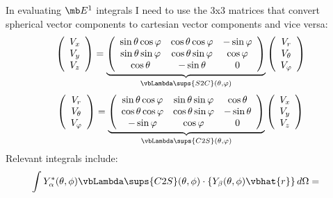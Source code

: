 \documentclass[letterpaper]{article}
\begin{document}
In evaluating $\mb E^1$ integrals I need to use the 3x3 matrices
that convert spherical vector components to cartesian vector components
and vice versa:
$$ \left(\begin{array}{c}V_x \\ V_y \\ V_z\end{array}\right)
  =
   \underbrace{
   \left(\begin{array}{ccc}
   \sin\theta\cos\varphi & \cos\theta \cos \varphi & -\sin\varphi \\
   \sin\theta\sin\varphi & \cos\theta \sin \varphi & \cos\varphi \\
   \cos\theta & -\sin\theta & 0
   \end{array}\right)
              }_{\vbLambda\sups{S2C}(\theta,\varphi)}
   \left(\begin{array}{c}V_r \\ V_\theta \\ V_\varphi\end{array}\right)
$$
$$ \left(\begin{array}{c}V_r \\ V_\theta \\ V_\varphi\end{array}\right)
  =
   \underbrace{
   \left(\begin{array}{ccc}
   \sin\theta\cos\varphi & \sin\theta \sin \varphi & \cos\theta \\
   \cos\theta\cos\varphi & \cos\theta \sin\varphi  & -\sin\theta \\
   -\sin\varphi & \cos\varphi & 0
   \end{array}\right)
              }_{\vbLambda\sups{C2S}(\theta,\varphi)}
   \left(\begin{array}{c}V_x \\ V_y \\ V_z \end{array}\right)
$$
Relevant integrals include:
\begin{align*}
  \int 
   Y^*_\alpha(\theta,\phi) \vbLambda\sups{C2S}(\theta,\phi)
   \cdot \left\{ Y_\beta(\theta,\phi)\vbhat{r}\right\}
   d\Omega
&=
\end{align*}

 
\end{document}
